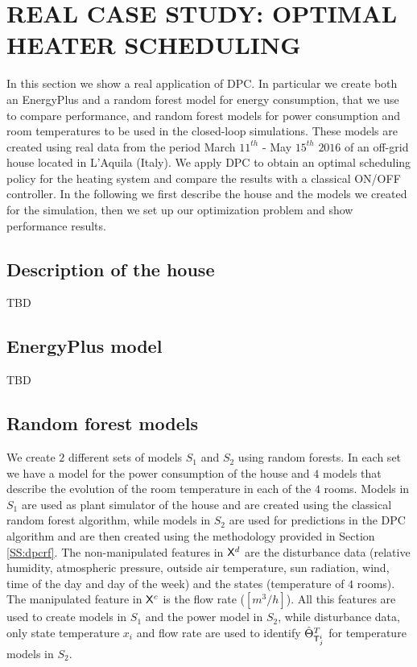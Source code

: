 \section{REAL CASE STUDY: OPTIMAL HEATER SCHEDULING} In this section we show a real application of DPC. In particular we create both an EnergyPlus and a random forest model for energy consumption, that we use to compare performance, and random forest models for power consumption and room temperatures to be used in the closed-loop simulations. These models are created using real data from the period March $11^{th}$ - May $15^{th}$ $2016$ of an off-grid house located in L'Aquila (Italy). We apply DPC to obtain an optimal scheduling policy for the heating system and compare the results with a classical ON/OFF controller. In the following we first describe the house and the models we created for the simulation, then we set up our optimization problem and show performance results.

\subsection{Description of the house} TBD

\subsection{EnergyPlus model} TBD

\subsection{Random forest models} We create $2$ different sets of models $S_1$ and $S_2$ using random forests. In each set we have a model for the power consumption of the house and $4$ models that describe the evolution of the room temperature in each of the $4$ rooms. Models in $S_1$ are used as plant simulator of the house and are created using the classical random forest algorithm, while models in $S_2$ are used for predictions in the DPC algorithm and are then created using the methodology provided in Section \ref{SS:dpcrf}. The non-manipulated features in $\mathsf{X}^d$ are the disturbance data (relative humidity, atmospheric pressure, outside air temperature, sun radiation, wind, time of the day and day of the week) and the states (temperature of $4$ rooms). The manipulated feature in $\mathsf{X}^c$ is the flow rate ($[m^3/h]$). All this features are used to create models in $S_1$ and the power model in $S_2$, while disturbance data, only state temperature $x_i$ and flow rate are used to identify $\hat{\Theta}^{T}_{\mathsf{T}^i_j}$ for temperature models in $S_2$.

